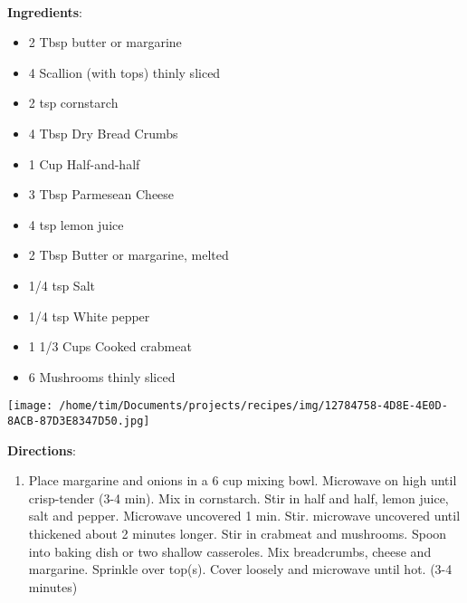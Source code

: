 \documentclass[11pt, twoside, openany]{book}
\begin{document}
 \label{crab-coquille}\hfill\textit{}\\
\begin{minipage}[t]{0.8\linewidth}
\textbf{Ingredients}:\vspace{-3mm}
\begin{multicols}{2}
\begin{itemize}\setlength\itemsep{-1mm}
\item 2 Tbsp butter or margarine
\item 4 Scallion (with tops) thinly sliced
\item 2 tsp cornstarch
\item 4 Tbsp Dry Bread Crumbs
\item 1 Cup Half-and-half
\item 3 Tbsp Parmesean Cheese
\item 4 tsp lemon juice
\item 2 Tbsp Butter or margarine, melted
\item 1/4 tsp Salt
\item 1/4 tsp White pepper
\item 1 1/3 Cups Cooked crabmeat
\item 6 Mushrooms thinly sliced
\end{itemize}
\end{multicols}
\end{minipage}
\begin{minipage}[t]{0.2\linewidth}
\centering \strut\vspace*{-\baselineskip}\newline
\texttt{[image: /home/tim/Documents/projects/recipes/img/12784758-4D8E-4E0D-8ACB-87D3E8347D50.jpg]}\\
\end{minipage}\vspace{3mm}
\textbf{Directions}:
\vspace{-3mm}\begin{enumerate}\setlength\itemsep{-1mm}
\item Place margarine and onions in a 6 cup mixing bowl. Microwave on high until crisp-tender (3-4 min). Mix in cornstarch. Stir in half and half, lemon juice, salt and pepper. Microwave uncovered 1 min. Stir. microwave uncovered until thickened about 2 minutes longer. Stir in crabmeat and mushrooms. Spoon into baking dish or two shallow casseroles. Mix breadcrumbs, cheese and margarine. Sprinkle over top(s). Cover loosely and microwave until hot. (3-4 minutes)
\end{enumerate}
\end{document}
